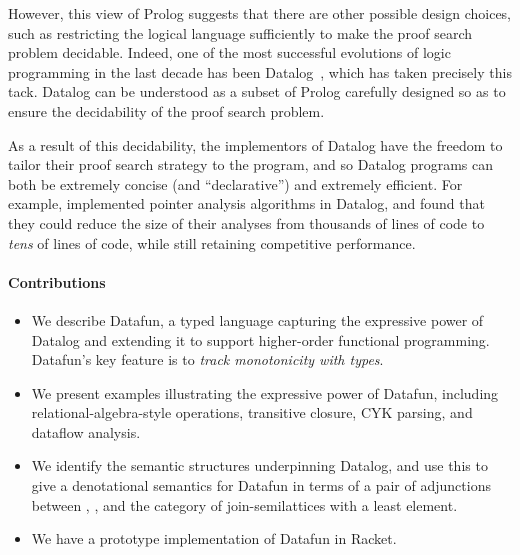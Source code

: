 However, this view of Prolog suggests that there are other possible
design choices, such as restricting the logical language sufficiently
to make the proof search problem decidable. Indeed, one of the most
successful evolutions of logic programming in the last decade has been
Datalog~\cite{datalog}, which has taken precisely this tack. Datalog
can be understood as a subset of Prolog carefully designed so as to
ensure the decidability of the proof search problem.



As a result of this decidability, the implementors of Datalog have the
freedom to tailor their proof search strategy to the program, and so
Datalog programs can both be extremely concise (and ``declarative'')
and extremely efficient. For example, \citet{whaley-lam} implemented
pointer analysis algorithms in Datalog, and found that they could
reduce the size of their analyses from thousands of lines of code to
\emph{tens} of lines of code, while still retaining competitive
performance.













\paragraph{Contributions}
\begin{itemize}
\item We describe Datafun, a typed language capturing the expressive power of
  Datalog and extending it to support higher-order functional programming.
  Datafun's key feature is to \emph{track monotonicity with types}.

\item We present examples illustrating the expressive power of Datafun,
  including relational-algebra-style operations, transitive closure, CYK
  parsing, and dataflow analysis.

\item We identify the semantic structures underpinning Datalog, and use this to
  give a denotational semantics for Datafun in terms of a pair of adjunctions
  between , , and the category of join-semilattices with a
  least element.

\item We have a prototype implementation of Datafun in Racket. 
\end{itemize}

